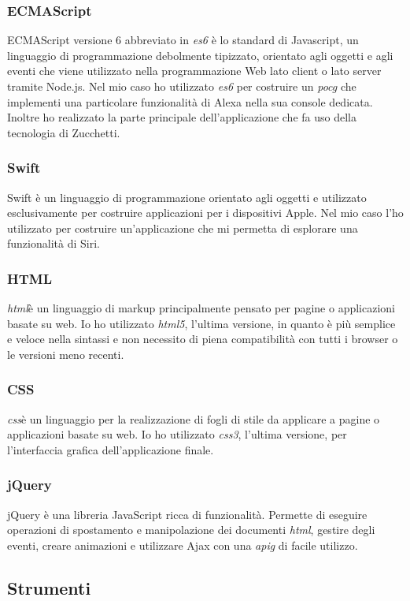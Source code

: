 		\subsubsection{ECMAScript}
		ECMAScript versione 6 abbreviato in \emph{\gls{es6}} è lo standard di Javascript, un linguaggio di programmazione debolmente tipizzato, orientato agli oggetti e agli eventi che viene utilizzato nella programmazione Web lato client o lato server tramite Node.js. Nel mio caso ho utilizzato \emph{\gls{es6}} per costruire un \emph{\gls{pocg}} che implementi una particolare funzionalità di Alexa nella sua console dedicata. Inoltre ho realizzato la parte principale dell'applicazione che fa uso della tecnologia di Zucchetti.
		\subsubsection{Swift}
		Swift è un linguaggio di programmazione orientato agli oggetti e utilizzato esclusivamente per costruire applicazioni per i dispositivi Apple. Nel mio caso l'ho utilizzato per costruire un'applicazione che mi permetta di esplorare una funzionalità di Siri.
		\subsubsection{HTML}
		\emph{\gls{html}}\glsfirstoccur è un linguaggio di markup principalmente pensato per pagine o applicazioni basate su web. Io ho utilizzato \emph{\gls{html}5}, l'ultima versione, in quanto è più semplice e veloce nella sintassi e non necessito di piena compatibilità con tutti i browser o le versioni meno recenti.
		\subsubsection{CSS}
		\emph{\gls{css}}\glsfirstoccur è un linguaggio per la realizzazione di fogli di stile da applicare a pagine o applicazioni basate su web. Io ho utilizzato \emph{\gls{css}3}, l'ultima versione, per l'interfaccia grafica dell'applicazione finale.
		\subsubsection{jQuery}
		jQuery è una libreria JavaScript ricca di funzionalità. Permette di eseguire operazioni di spostamento e manipolazione dei documenti \emph{\gls{html}}, gestire degli eventi, creare animazioni e utilizzare Ajax con una \emph{\gls{apig}} di facile utilizzo.
	\subsection{Strumenti}
